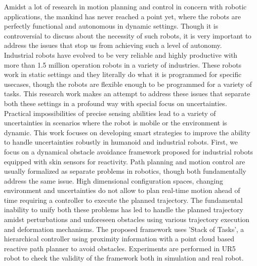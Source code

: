 \documentclass[english,a4paper,11pt,twoside,table]{StyleThese}
\begin{document}
\begin{vcenterpage}
\iftoggle{ThesisInEnglish}{%
\section*{Abstract}
}{%
\section*{Resume}
}
 Amidst a lot of research in motion planning and control in concern with robotic applications, the mankind has never reached a point yet, where the robots are perfectly functional and autonomous in dynamic settings. Though it is controversial to discuss about the necessity of such robots, it is very important to address the issues that stop us from achieving such a level of autonomy. Industrial robots have evolved to be very reliable and highly productive with more than 1.5 million operation robots in a variety of industries. These robots work in static settings and they literally do what it is programmed for specific usecases, though the robots are flexible enough to be programmed for a variety of tasks. This research work makes an attempt to address these issues that separate both these settings in a profound way with special focus on uncertainties. Practical impossibilities of precise sensing abilities lead to a variety of uncertainties in scenarios where the robot is mobile or the environment is dynamic. This work focuses on developing smart strategies to improve the ability to handle uncertainties robustly in humanoid and industrial robots. First, we focus on a dynamical obstacle avoidance framework proposed for industrial robots equipped with skin sensors for reactivity. Path planning and motion control are usually formalized as separate problems in robotics, though both fundamentally address the same issue. High dimensional configuration spaces, changing environment and uncertainties do not allow to plan real-time motion ahead of time requiring a controller to execute the planned trajectory. The fundamental inability to unify both these problems has led to handle the planned trajectory amidst perturbations and unforeseen obstacles using various trajectory execution and deformation mechanisms. The proposed framework uses 'Stack of Tasks', a hierarchical controller using proximity information with a point cloud based reactive path planner to avoid obstacles. Experiments are performed in UR5 robot to check the validity of the framework both in simulation and real robot. 


\end{vcenterpage}
\end{document}

